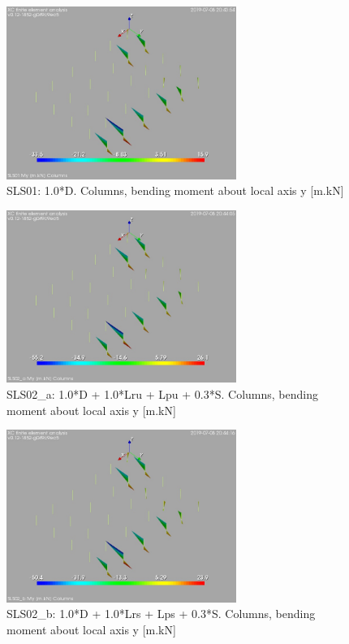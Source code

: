 \begin{figure}
\begin{center}
\includegraphics[width=75mm]{./annex_res_columns/graphics/resSimplLC/SLS01columnsMy}
\caption{SLS01: 1.0*D. Columns, bending moment about local axis y [m.kN]}
\end{center}
\end{figure}

\begin{figure}
\begin{center}
\includegraphics[width=75mm]{./annex_res_columns/graphics/resSimplLC/SLS02_acolumnsMy}
\caption{SLS02\_a: 1.0*D + 1.0*Lru + Lpu + 0.3*S. Columns, bending moment about local axis y [m.kN]}
\end{center}
\end{figure}

\begin{figure}
\begin{center}
\includegraphics[width=75mm]{./annex_res_columns/graphics/resSimplLC/SLS02_bcolumnsMy}
\caption{SLS02\_b: 1.0*D + 1.0*Lrs + Lps + 0.3*S. Columns, bending moment about local axis y [m.kN]}
\end{center}
\end{figure}

